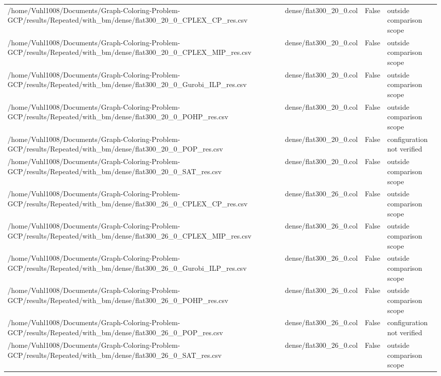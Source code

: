 \begin{table}[htbp]
\begin{tabular}{llll}
/home/Vuhl1008/Documents/Graph-Coloring-Problem-GCP/results/Repeated/with\_bm/dense/flat300\_20\_0\_CPLEX\_CP\_res.csv & dense/flat300\_20\_0.col & False & outside comparison scope \\
/home/Vuhl1008/Documents/Graph-Coloring-Problem-GCP/results/Repeated/with\_bm/dense/flat300\_20\_0\_CPLEX\_MIP\_res.csv & dense/flat300\_20\_0.col & False & outside comparison scope \\
/home/Vuhl1008/Documents/Graph-Coloring-Problem-GCP/results/Repeated/with\_bm/dense/flat300\_20\_0\_Gurobi\_ILP\_res.csv & dense/flat300\_20\_0.col & False & outside comparison scope \\
/home/Vuhl1008/Documents/Graph-Coloring-Problem-GCP/results/Repeated/with\_bm/dense/flat300\_20\_0\_POHP\_res.csv & dense/flat300\_20\_0.col & False & outside comparison scope \\
/home/Vuhl1008/Documents/Graph-Coloring-Problem-GCP/results/Repeated/with\_bm/dense/flat300\_20\_0\_POP\_res.csv & dense/flat300\_20\_0.col & False & configuration not verified \\
/home/Vuhl1008/Documents/Graph-Coloring-Problem-GCP/results/Repeated/with\_bm/dense/flat300\_20\_0\_SAT\_res.csv & dense/flat300\_20\_0.col & False & outside comparison scope \\
/home/Vuhl1008/Documents/Graph-Coloring-Problem-GCP/results/Repeated/with\_bm/dense/flat300\_26\_0\_CPLEX\_CP\_res.csv & dense/flat300\_26\_0.col & False & outside comparison scope \\
/home/Vuhl1008/Documents/Graph-Coloring-Problem-GCP/results/Repeated/with\_bm/dense/flat300\_26\_0\_CPLEX\_MIP\_res.csv & dense/flat300\_26\_0.col & False & outside comparison scope \\
/home/Vuhl1008/Documents/Graph-Coloring-Problem-GCP/results/Repeated/with\_bm/dense/flat300\_26\_0\_Gurobi\_ILP\_res.csv & dense/flat300\_26\_0.col & False & outside comparison scope \\
/home/Vuhl1008/Documents/Graph-Coloring-Problem-GCP/results/Repeated/with\_bm/dense/flat300\_26\_0\_POHP\_res.csv & dense/flat300\_26\_0.col & False & outside comparison scope \\
/home/Vuhl1008/Documents/Graph-Coloring-Problem-GCP/results/Repeated/with\_bm/dense/flat300\_26\_0\_POP\_res.csv & dense/flat300\_26\_0.col & False & configuration not verified \\
/home/Vuhl1008/Documents/Graph-Coloring-Problem-GCP/results/Repeated/with\_bm/dense/flat300\_26\_0\_SAT\_res.csv & dense/flat300\_26\_0.col & False & outside comparison scope \\

\end{tabular}
\end{table}
